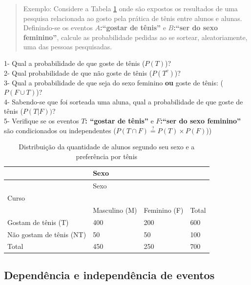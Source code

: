 \documentclass[
]{book}
\begin{document}
\hfill\break

\begin{quote}
Exemplo: Considere a Tabela \ref{tab:table5} onde são expostos os resultados de uma pesquisa relacionada ao gosto pela prática de tênis entre alunos e alunas. Definindo-se os eventos \textbf{\(A\):``gostar de tênis''} e \textbf{\(B\):``ser do sexo feminino''}, calcule as probabilidade pedidas ao se sortear, aleatoriamente, uma das pessoas pesquisadas.
\end{quote}

\hfill\break

1- Qual a probabilidade de que goste de tênis (\(P(T)\))?\\
2- Qual probabilidade de que não goste de tênis (\(P(T^{c})\))?\\
3- Qual a probabilidade de que seja do sexo feminino \textbf{ou} goste de tênis: (\(P(F \cup T)\))?\\
4- Sabendo-se que foi sorteada uma aluna, qual a probabilidade de que goste de tênis (\(P(T|F))\)?\\
5- Verifique se os eventos \textbf{\(T\): ``gostar de tênis''} e \textbf{\(F\):``ser do sexo feminino''} são condicionados ou independentes (\(P(T \cap F) \stackrel{?}{=} P(T) \times P(F)\)))

\hfill\break

\begin{longtable}[]{@{}llll@{}}
\caption{\label{tab:table5} Distribuição da quantidade de alunos segundo seu sexo e a preferência por tênis}\tabularnewline
\toprule()
& Sexo & & \\
\midrule()
\endfirsthead
\toprule()
& Sexo & & \\
\midrule()
\endhead
Curso & & & \\
& Masculino (M) & Feminino (F) & Total \\
Gostam de tênis (T) & 400 & 200 & 600 \\
Não gostam de tênis (NT) & 50 & 50 & 100 \\
Total & 450 & 250 & 700 \\
\bottomrule()
\end{longtable}

\hypertarget{dependuxeancia-e-independuxeancia-de-eventos}{%
\subsection{Dependência e independência de eventos}\label{dependuxeancia-e-independuxeancia-de-eventos}}
\end{document}
